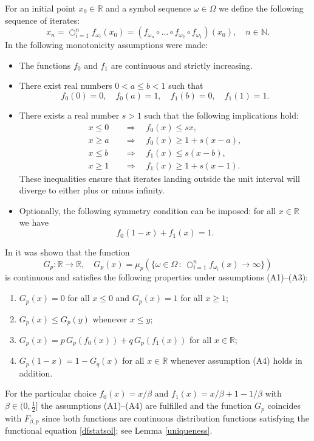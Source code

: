 \documentclass[12pt]{amsart}
\theoremstyle{definition}
\theoremstyle{remark}
\numberwithin{equation}{section}
\begin{document}
For an initial point $x_0 \in \mathbb{R}$ and a symbol sequence $\omega \in \Omega$ we define the following sequence of iterates:
\[
x_n = \bigcirc_{i=1}^n f_{\omega_i}(x_0) = (f_{\omega_n} \circ \dots \circ f_{\omega_2} \circ f_{\omega_1})(x_0), \quad n \in \mathbb{N}.
\]
In \cite{MS} the following monotonicity assumptions were made:
\begin{itemize}
\item[(A1)] The functions $f_0$ and $f_1$ are continuous and strictly increasing.
\item[(A2)] There exist real numbers $0 < a \leq b < 1$ such that
\[
f_0(0) = 0, \quad
f_0(a) = 1, \quad
f_1(b) = 0, \quad
f_1(1) = 1.
\]
\item[(A3)] There exists a real number $s > 1$ such that the following implications hold:
\[
\begin{split}
x \leq 0 & \quad\Rightarrow\quad f_0(x) \leq s x, \\
x \geq a & \quad\Rightarrow\quad f_0(x) \geq 1+s(x-a), \\
x \leq b & \quad\Rightarrow\quad f_1(x) \leq s(x-b), \\ 
x \geq 1 & \quad\Rightarrow\quad f_1(x) \geq 1+s(x-1).
\end{split}
\]
These inequalities ensure that iterates landing outside the unit interval will diverge to either plus or minus infinity.
\item[(A4)] Optionally, the following symmetry condition can be imposed: for all $x \in \mathbb{R}$ we have
\[
f_0(1-x) + f_1(x) = 1.
\]
\end{itemize}

In \cite{MS} it was shown that the function
\[
G_{p} : \mathbb{R} \to \mathbb{R}, \quad
G_{p}(x) = \mu_p(\{ \omega \in \Omega \,:\, \bigcirc_{i=1}^n f_{\omega_i}(x) \to \infty \})
\]
is continuous and satisfies the following properties under assumptions (A1)--(A3):
\begin{enumerate}
\item[(i)] $G_{p}(x) = 0$ for all $x \leq 0$ and $G_{p}(x) = 1$ for all $x \geq 1$;
\item[(ii)] $G_{p}(x) \leq G_p(y)$ whenever $x \leq y$;
\item[(iii)] $G_p(x) = p\,G_p(f_0(x)) + q\,G_p(f_1(x))$ for all $x \in \mathbb{R}$;
\item[(iv)] $G_{p}(1-x) = 1-G_{q}(x)$ for all $x \in \mathbb{R}$ whenever assumption (A4) holds in addition.
\end{enumerate}
For the particular choice $f_0(x) = x/\beta$ and $f_1(x) = x/\beta + 1-1/\beta$ with $\beta \in (0,\frac{1}{2}]$ the assumptions (A1)--(A4) are fulfilled and the function $G_p$ coincides with $F_{\beta,p}$ since both functions are continuous distribution functions satisfying the functional equation \eqref{dfstatsol}; see Lemma \ref{uniqueness}.
\end{document}
